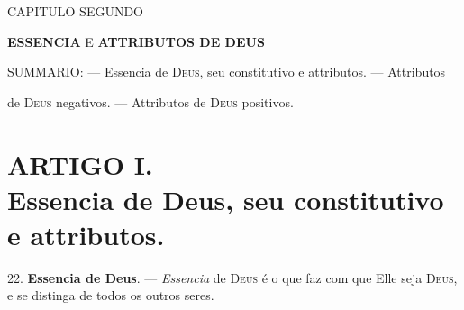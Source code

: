 



 CAPITULO SEGUNDO

\textbf{ESSENCIA} E \textbf{ATTRIBUTOS DE DEUS}

\textsc{SUMMARIO}: --- Essencia de \textsc{Deus}, seu constitutivo e attributos. --- Attributos

de \textsc{Deus} negativos. --- Attributos de \textsc{Deus} positivos.


\section*{ARTIGO I.\\ Essencia de Deus, seu constitutivo e attributos.}

22. \textbf{Essencia de Deus}. --- \emph{Essencia} de \textsc{Deus} é o que faz com que Elle seja \textsc{Deus}, e se distinga de todos os outros seres.

